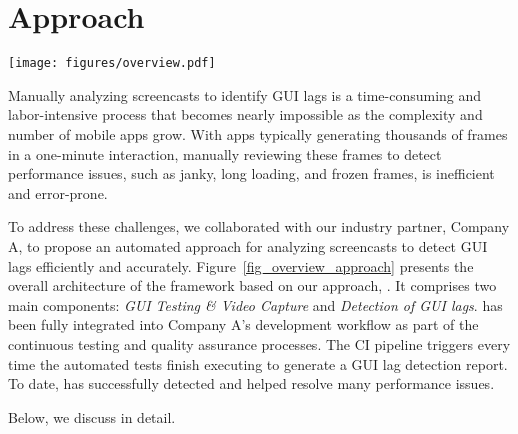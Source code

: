 \section{Approach}
\label{sec:approach}

\begin{figure*}
	\centering
    \texttt{[image: figures/overview.pdf]}
	\caption{The overall architecture of \tool.}
	\label{fig_overview_approach}
\end{figure*}

Manually analyzing screencasts to identify GUI lags is a time-consuming and labor-intensive process that becomes nearly impossible as the complexity and number of mobile apps grow. With apps typically generating thousands of frames in a one-minute interaction, manually reviewing these frames to detect performance issues, such as janky, long loading, and frozen frames, is inefficient and error-prone. 

To address these challenges, we collaborated with our industry partner, Company A, to propose an automated approach for analyzing screencasts to detect GUI lags efficiently and accurately. Figure~\ref{fig_overview_approach} presents the overall architecture of the framework based on our approach, \tool.
It comprises two main components: \textit{GUI Testing \& Video Capture} and \textit{Detection of GUI lags}. %
\tool has been fully integrated into Company A's development workflow as part of the continuous testing and quality assurance processes. The CI pipeline triggers \tool every time the automated tests finish executing to generate a GUI lag detection report. To date, \tool has successfully detected and helped resolve many performance issues. 

Below, we discuss \tool in detail. 



